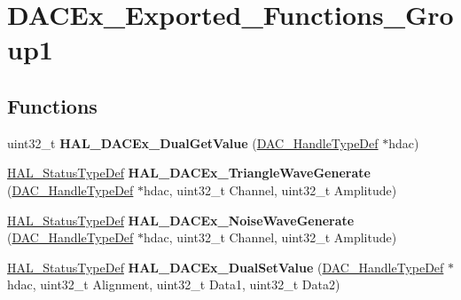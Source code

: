 \hypertarget{group___d_a_c_ex___exported___functions___group1}{}\section{D\+A\+C\+Ex\+\_\+\+Exported\+\_\+\+Functions\+\_\+\+Group1}
\label{group___d_a_c_ex___exported___functions___group1}
\subsection*{Functions}
\begin{DoxyCompactItemize}
\item 
\mbox{\label{group___d_a_c_ex___exported___functions___group1_ga519cdeb156249b400365746b65a1d445}} 
uint32\+\_\+t {\bfseries H\+A\+L\+\_\+\+D\+A\+C\+Ex\+\_\+\+Dual\+Get\+Value} (\mbox{\hyperlink{struct_d_a_c___handle_type_def}{D\+A\+C\+\_\+\+Handle\+Type\+Def}} $\ast$hdac)
\item 
\mbox{\label{group___d_a_c_ex___exported___functions___group1_gaab5fcb54ac9721673810965d72bfc408}} 
\mbox{\hyperlink{stm32f7xx__hal__def_8h_a63c0679d1cb8b8c684fbb0632743478f}{H\+A\+L\+\_\+\+Status\+Type\+Def}} {\bfseries H\+A\+L\+\_\+\+D\+A\+C\+Ex\+\_\+\+Triangle\+Wave\+Generate} (\mbox{\hyperlink{struct_d_a_c___handle_type_def}{D\+A\+C\+\_\+\+Handle\+Type\+Def}} $\ast$hdac, uint32\+\_\+t Channel, uint32\+\_\+t Amplitude)
\item 
\mbox{\label{group___d_a_c_ex___exported___functions___group1_ga6081e8d9d87bd7bfa96d0456def1e1d5}} 
\mbox{\hyperlink{stm32f7xx__hal__def_8h_a63c0679d1cb8b8c684fbb0632743478f}{H\+A\+L\+\_\+\+Status\+Type\+Def}} {\bfseries H\+A\+L\+\_\+\+D\+A\+C\+Ex\+\_\+\+Noise\+Wave\+Generate} (\mbox{\hyperlink{struct_d_a_c___handle_type_def}{D\+A\+C\+\_\+\+Handle\+Type\+Def}} $\ast$hdac, uint32\+\_\+t Channel, uint32\+\_\+t Amplitude)
\item 
\mbox{\label{group___d_a_c_ex___exported___functions___group1_ga9c8472b2be242429225f1c9aa722df75}} 
\mbox{\hyperlink{stm32f7xx__hal__def_8h_a63c0679d1cb8b8c684fbb0632743478f}{H\+A\+L\+\_\+\+Status\+Type\+Def}} {\bfseries H\+A\+L\+\_\+\+D\+A\+C\+Ex\+\_\+\+Dual\+Set\+Value} (\mbox{\hyperlink{struct_d_a_c___handle_type_def}{D\+A\+C\+\_\+\+Handle\+Type\+Def}} $\ast$hdac, uint32\+\_\+t Alignment, uint32\+\_\+t Data1, uint32\+\_\+t Data2)

\end{DoxyCompactItemize}
